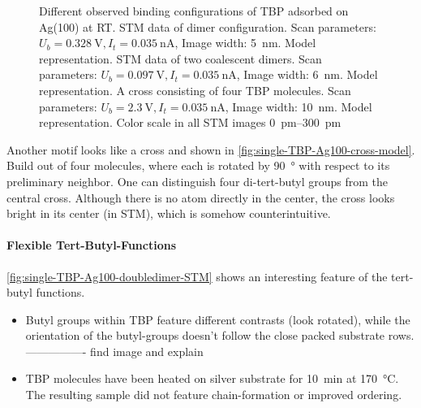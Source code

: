\begin{figure}[]
{			\label{fig:single-TBP-Ag100-cross-model}
		}
		\caption{Different observed binding configurations of TBP adsorbed on Ag(100) at RT.  STM data of dimer configuration. Scan parameters: $U_b=\SI{0.328}{\volt}, I_t=\SI{0.035}{\nano \ampere}$, Image width: \SI{5}{\nm}.  Model representation.  STM data of two coalescent dimers. Scan parameters: $U_b=\SI{0.097}{\volt}, I_t=\SI{0.035}{\nano \ampere}$, Image width: \SI{6}{\nm}.  Model representation.  A cross consisting of four TBP molecules. Scan parameters: $U_b=\SI{2.3}{\volt}, I_t=\SI{0,035}{\nano \ampere}$, Image width: \SI{10}{\nm}.  Model representation. Color scale in all STM images \SIrange{0}{300}{\pico\meter}}
		\label{fig:single-TBP-Ag100-doubledimer}
	\end{figure}
	Another motif looks like a cross and shown in \autoref{fig:single-TBP-Ag100-cross-model}. Build out of four molecules, where each is rotated by \SI{90}{\degree} with respect to its preliminary neighbor. One can distinguish four di-tert-butyl groups from the central cross. Although there is no atom directly in the center, the cross looks bright in its center (in STM), which is somehow counterintuitive. 
	
	
	\paragraph{Flexible Tert-Butyl-Functions}
	\autoref{fig:single-TBP-Ag100-doubledimer-STM} shows an interesting feature of the tert-butyl functions.
	
	\begin{itemize}
		\item Butyl groups within TBP feature different contrasts (look rotated), while the orientation of the butyl-groups doesn't follow the close packed substrate rows. ---------------- find image and explain
		\item TBP molecules have been heated on silver substrate for \SI{10}{\minute} at \SI{170}{\celsius}. The resulting sample did not feature chain-formation or improved ordering.
	\end{itemize}
	
